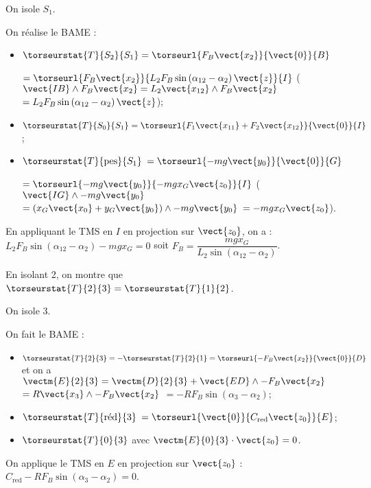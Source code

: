 \ifprof
\begin{corrige}
On isole $S_1$. 

On réalise le BAME : 
\begin{itemize}
\item $\torseurstat{T}{S_2}{S_1}=\torseurl{ F_B\vect{x_{2}}}{\vect{0}}{B}$ 

$=\torseurl{ F_B\vect{x_{2}}}{L_2 F_B \sin  \left(\alpha_{12}-\alpha_2\right) \vect{z}}{I}$ ($\vect{IB}\wedge F_B\vect{x_{2}}=L_2\vect{x_{12}}\wedge  F_B\vect{x_{2}}$ $=L_2 F_B \sin  \left(\alpha_{12}-\alpha_2\right) \vect{z}$);
\item $\torseurstat{T}{S_0}{S_1}=\torseurl{F_1\vect{x_{11}}+F_2\vect{x_{12}}}{\vect{0}}{I}$;
\item $\torseurstat{T}{ \text{pes} }{S_1}$ $=\torseurl{-mg \vect{y_{0}}}{\vect{0}}{G}$

$=\torseurl{-mg \vect{y_{0}}}{-mgx_G\vect{z_{0}}}{I}$ ($\vect{IG}\wedge -mg \vect{y_{0}}$ $=\left(x_G\vect{x_{0}}+y_G\vect{y_{0}} \right) \wedge  -mg \vect{y_{0}}$ $= -mgx_G\vect{z_{0}}$).
\end{itemize}

En appliquant le TMS en $I$ en projection sur $\vect{z_0}$, on a : 
$L_2 F_B \sin  \left(\alpha_{12}-\alpha_2\right)  -mgx_G = 0 $ soit
$ F_B    = \dfrac{mgx_G}{L_2  \sin  \left(\alpha_{12}-\alpha_2\right)} $. 
\end{corrige}
\else
\fi

\ifprof
\begin{corrige}
En isolant 2, on montre que $\torseurstat{T}{2}{3}=\torseurstat{T}{1}{2}$. 

On isole 3. 

On fait le BAME :
\begin{itemize}
\item $\torseurstat{T}{2}{3}=-\torseurstat{T}{2}{1}=\torseurl{ -F_B\vect{x_{2}}}{\vect{0}}{D}$ et on a $\vectm{E}{2}{3} = \vectm{D}{2}{3} + \vect{ED}\wedge -F_B\vect{x_{2}}$ $=R\vect{x_3}\wedge -F_B\vect{x_{2}}$ $=-RF_B \sin\left( \alpha_3- \alpha_2\right)$;
\item $\torseurstat{T}{\text{réd}}{3}$ $ = \torseurl{ \vect{0}}{C_{\text{red}}\vect{z_0}}{E}$;
\item $\torseurstat{T}{0}{3}$ avec $\vectm{E}{0}{3}\cdot \vect{z_0} = 0$.
\end{itemize}
On applique le TMS en $E$ en projection sur $\vect{z_0}$ : $C_{\text{red}}-RF_B \sin \left( \alpha_3 - \alpha_2\right) = 0$.
\end{corrige}
\else
\fi

